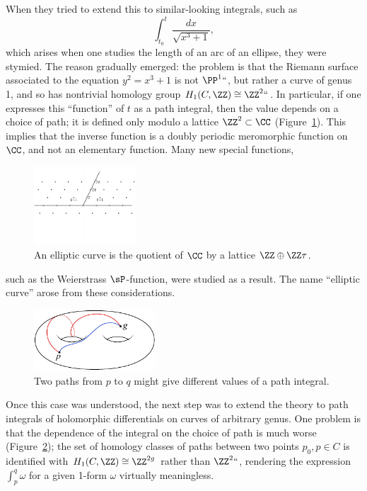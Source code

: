 When they tried to extend this to similar-looking integrals, such as
$$
\int_{t_0}^t \frac{dx}{\sqrt{x^3+1}},
$$
which arises when one studies the length of an arc of an ellipse, they
%
were stymied. The reason gradually emerged: the problem is that the
Riemann surface associated to the equation $y^2 = x^3+1$ is not
$\PP^1` `$, but rather a curve of genus 1, and so has nontrivial
homology group $H_1(C, \ZZ) \cong \ZZ^2` `$. In particular, if one
expresses this ``function'' of $t$  as a path integral, then the value
\vadjust{\goodbreak}%
depends on a choice of path; it is defined only modulo a lattice
$\ZZ^2 \subset \CC$ (Figure~\ref{a lattice}). This implies
that the inverse function is a doubly periodic 
%
meromorphic function
on
$\CC$, and not an elementary function. Many new special functions,
%
\begin{figure}
\centerline{\includegraphics[height=1.15in,trim=0 40 0 12,clip]{"main/Fig04-2"}}
\vskip-6pt
\caption{An elliptic curve is the quotient of $\CC$ by a lattice $\ZZ\oplus \ZZ\tau$.}
\label{a lattice}
%
\end{figure}
%
such as the 
Weierstrass $\sP$-function,%
%
%
were studied as a result. The name 
``elliptic curve''
%
arose from these considerations. 

\begin{figure}[b]
\vskip3pt
\includegraphics[height=0.9in]{"main/Fig04-1"}
\vskip-3pt
\caption{Two paths from $p$ to $q$ might give different values of a path integral.}
\label{dependence on path}
\end{figure}

Once this case was understood, the next step was to extend the theory
to
path integrals
%
of 
holomorphic differentials
%
on curves of arbitrary
genus. One problem is that the dependence of the integral on the
choice of path is much worse 
(Figure~\ref{dependence on path});
the set of homology classes of paths
between two points $p_0, p \in C$ is identified with $H_1(C,\ZZ) \cong
\ZZ^{2g}$ rather than $\ZZ^2` `$, rendering the expression $\int_p^q
\omega$ for a given 1-form $\omega$ virtually meaningless. 
{\meshing\par}

